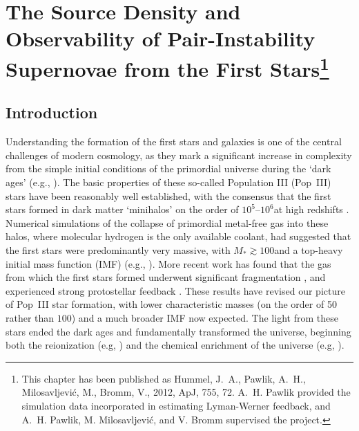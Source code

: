 \documentclass[../thesis.tex]{subfiles}
\begin{document}
\chapter{The Source Density and Observability of Pair-Instability Supernovae from the First Stars\footnote{This chapter has been published as Hummel, J.~A., Pawlik, A.~H., Milosavljevi\'c, M., Bromm, V., 2012, ApJ, 755, 72. A.~H. Pawlik provided the simulation data incorporated in estimating Lyman-Werner feedback, and A.~H. Pawlik, M. Milosavljevi\'c, and V. Bromm supervised the project.}}

\section{Introduction}
Understanding the formation of the first stars and galaxies is one of
the central challenges of modern cosmology, as they mark a significant
increase in complexity from the simple initial conditions of the
primordial universe during the `dark ages' (e.g.,
\citealt{BarkanaLoeb2001, Miralda-Escude2003, Brommetal2009,
  Loeb2010}). The basic properties of these so-called Population III
(Pop~III) stars have been reasonably well established, with the
consensus that the first stars formed in dark matter `minihalos' on
the order of $10^5$--$10^6$\msun at high redshifts
\citep{CouchmanRees1986,HaimanThoulLoeb1996,Tegmarketal1997}.
Numerical simulations of the collapse of primordial metal-free gas
into these halos, where molecular hydrogen is the only available
coolant, had suggested that the first stars were predominantly very
massive, with $M_* \gtrsim100$\msun and a top-heavy initial mass
function (IMF) (e.g., \citealt{BrommCoppiLarson1999,
  BrommCoppiLarson2002, AbelBryanNorman2002, BrommLarson2004,
  Yoshidaetal2006, OSheaNorman2007}).  More recent work has found
that the gas from which the first stars formed underwent significant
fragmentation \citep{StacyGreifBromm2010, Clarketal2011b,
  Greifetal2011, Greifetal2012}, and experienced strong protostellar
feedback \citep{Hosokawaetal2011, StacyGreifBromm2012}.  These results
have revised our picture of Pop~III star formation, with lower
characteristic masses (on the order of 50 rather than $100$\msun) and
a much broader IMF now expected.  The light from these stars ended the
dark ages and fundamentally transformed the universe, beginning both
the reionization (e.g, \citealt{Meiksin2009}) and the chemical
enrichment of the universe (e.g, \citealt{KarlssonBrommHawthorn2013}).
\end{document}
